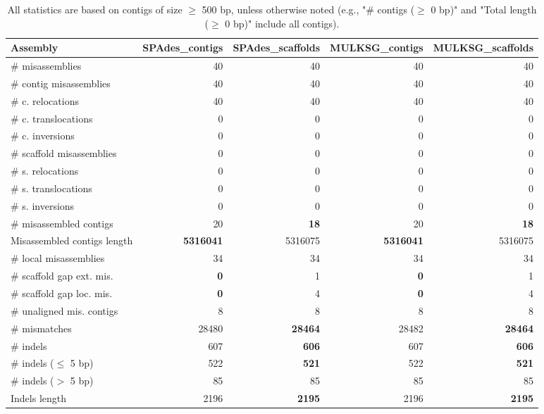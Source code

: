 \documentclass[12pt,a4paper]{article}
\begin{document}
\begin{table}[ht]
\begin{center}
\caption{All statistics are based on contigs of size $\geq$ 500 bp, unless otherwise noted (e.g., "\# contigs ($\geq$ 0 bp)" and "Total length ($\geq$ 0 bp)" include all contigs).}
\begin{tabular}{|l*{4}{|r}|}
\hline
Assembly & SPAdes\_contigs & SPAdes\_scaffolds & MULKSG\_contigs & MULKSG\_scaffolds \\ \hline
\# misassemblies & 40 & 40 & 40 & 40 \\ \hline
\hspace{2mm}\# contig misassemblies & 40 & 40 & 40 & 40 \\ \hline
\hspace{5mm}\# c. relocations & 40 & 40 & 40 & 40 \\ \hline
\hspace{5mm}\# c. translocations & 0 & 0 & 0 & 0 \\ \hline
\hspace{5mm}\# c. inversions & 0 & 0 & 0 & 0 \\ \hline
\hspace{2mm}\# scaffold misassemblies & 0 & 0 & 0 & 0 \\ \hline
\hspace{5mm}\# s. relocations & 0 & 0 & 0 & 0 \\ \hline
\hspace{5mm}\# s. translocations & 0 & 0 & 0 & 0 \\ \hline
\hspace{5mm}\# s. inversions & 0 & 0 & 0 & 0 \\ \hline
\# misassembled contigs & 20 & {\bf 18} & 20 & {\bf 18} \\ \hline
Misassembled contigs length & {\bf 5316041} & 5316075 & {\bf 5316041} & 5316075 \\ \hline
\# local misassemblies & 34 & 34 & 34 & 34 \\ \hline
\# scaffold gap ext. mis. & {\bf 0} & 1 & {\bf 0} & 1 \\ \hline
\# scaffold gap loc. mis. & {\bf 0} & 4 & {\bf 0} & 4 \\ \hline
\# unaligned mis. contigs & 8 & 8 & 8 & 8 \\ \hline
\# mismatches & 28480 & {\bf 28464} & 28482 & {\bf 28464} \\ \hline
\# indels & 607 & {\bf 606} & 607 & {\bf 606} \\ \hline
\hspace{5mm}\# indels ($\leq$ 5 bp) & 522 & {\bf 521} & 522 & {\bf 521} \\ \hline
\hspace{5mm}\# indels ($>$ 5 bp) & 85 & 85 & 85 & 85 \\ \hline
Indels length & 2196 & {\bf 2195} & 2196 & {\bf 2195} \\ \hline
\end{tabular}
\end{center}
\end{table}
\end{document}
